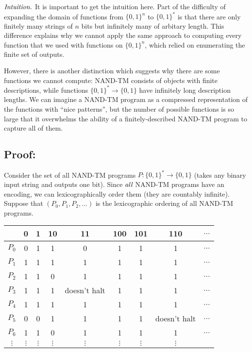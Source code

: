 \documentclass[11pt]{article}
\theoremstyle{definition}
\theoremstyle{remark}
\begin{document}
$\emph{Intuition.}$
It is important to get the intuition here. Part of the difficulty of expanding the domain of functions from $\{0,1\}^n$ to $\{0,1\}^*$ is that there are only finitely many strings of $n$ bits but infinitely many of arbitary length. This difference explains why we cannot apply the same approach to computing every function that we used with functions on $\{0,1\}^n$, which relied on enumerating the finite set of outputs. 

However, there is another distinction which suggests why there are some functions we cannot compute: NAND-TM consists of objects with finite descriptions, while functions $\{0,1\}^* \to \{0,1\}$ have infinitely long description lengths. We can imagine a NAND-TM program as a compressed representation of the functions with ``nice patterns'', but the number of possible functions is so large that it overwhelms the ability of a finitely-described NAND-TM program to capture all of them.

\subsection{Proof:}

\proof
Consider the set of all NAND-TM programs $P: \{0, 1\}^* \rightarrow \{0, 1\}$ (takes any binary input string and outputs one bit). 
Since $\emph{all}$ NAND-TM programs have an encoding, we can lexicographically order them
(they are countably infinite). Suppose that $(P_0, P_1, P_2, \dots)$ is the lexicographic ordering of all NAND-TM programs.

\begin{center}
    \begin{tabular}{c|cccccccc}
         & 0 & 1 & 10 & 11 & 100 & 101 & 110 & $\dots$ \\ 
        \hline
        $P_0$ & \cellcolor{green!20}0 & 1 & 1 & 0 & 1 & 1 & 1 & $\dots$ \\ 
        $P_1$ & 1 & \cellcolor{green!20}1 & 1 & 1 & 1 & 1 & 1 & $\dots$ \\ 
        $P_2$ & 1 & 1 & \cellcolor{green!20}0 & 1 & 1 & 1 & 1 & $\dots$ \\ 
        $P_3$ & 1 & 1 & 1 & \cellcolor{green!20}doesn't halt & 1 & 1 & 1 & $\dots$ \\ 
        $P_4$ & 1 & 1 & 1 & 1 & \cellcolor{green!20}1 & 1 & 1 & $\dots$ \\ 
        $P_5$ & 0 & 0 & 1 & 1 & 1 & \cellcolor{green!20}1 & doesn't halt & $\dots$ \\ 
        $P_6$ & 1 & 1 & 0 & 1 & 1 & 1 & \cellcolor{green!20}1 & $\dots$ \\ 
        $\vdots$ & $\vdots$ & $\vdots$ & $\vdots$ & $\vdots$ & $\vdots$ & $\vdots$ & $\vdots$ & 
    \end{tabular}
\end{center}
\end{document}
